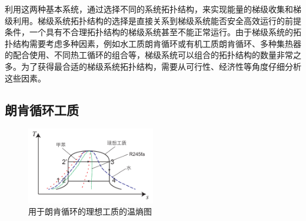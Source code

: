 利用这两种基本系统，通过选择不同的系统拓扑结构，来实现能量的梯级收集和梯级利用。梯级系统拓扑结构的选择是直接关系到梯级系统能否安全高效运行的前提条件，一个具有不合理拓扑结构的梯级系统甚至不能正常运行。由于梯级系统的拓扑结构需要考虑多种因素，例如水工质朗肯循环或有机工质朗肯循环、多种集热器的配合使用、不同热工循环的组合等，梯级系统可以组合的拓扑结构的数量非常之多。为了获得最合适的梯级系统拓扑结构，需要从可行性、经济性等角度仔细分析这些因素。

\subsection{朗肯循环工质}
\label{sec:RankineCycleFluid}

\begin{figure}[!ht]
\centering 
\includegraphics[width=0.5\textwidth]{fig/idealTs}
\caption{用于朗肯循环的理想工质的温熵图}
\label{fig:idealTs}
\end{figure}

